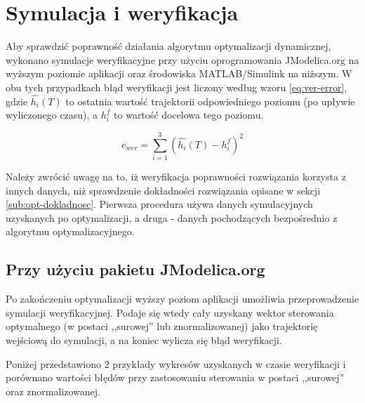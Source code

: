 \section{Symulacja i weryfikacja}
\label{sec:sym-wer}

Aby sprawdzić poprawność działania algorytmu optymalizacji dynamicznej, wykonano symulacje weryfikacyjne przy użyciu oprogramowania JModelica.org na wyższym poziomie aplikacji oraz środowiska MATLAB/Simulink na niższym.
W obu tych przypadkach błąd weryfikacji jest liczony według wzoru \ref{eq:ver-error}, gdzie $\hat{h_{i}}(T)$ to ostatnia wartość trajektorii odpowiedniego poziomu (po upływie wyliczonego czasu), a $h_{i}^{f}$ to wartość docelowa tego poziomu.

\begin{equation}\label{eq:ver-error}
e_{wer} = \sum_{i=1}^{3} (\hat{h_{i}}(T) - h_{i}^{f})^{2}
\end{equation}

Należy zwrócić uwagę na to, iż weryfikacja poprawności rozwiązania korzysta z innych danych, niż sprawdzenie dokładności rozwiązania opisane w sekcji \ref{sub:opt-dokladnosc}. Pierwsza procedura używa danych symulacyjnych uzyskanych po optymalizacji, a druga - danych pochodzących bezpośrednio z algorytmu optymalizacyjnego.

\subsection{Przy użyciu pakietu JModelica.org}
\label{sub:sym-wer-jmodelica}

Po zakończeniu optymalizacji wyższy poziom aplikacji umożliwia przeprowadzenie symulacji weryfikacyjnej. Podaje się wtedy cały uzyskany wektor sterowania optymalnego (w postaci ,,surowej'' lub znormalizowanej) jako trajektorię wejściową do symulacji, a na koniec wylicza się błąd weryfikacji.

Poniżej przedstawiono 2 przykłady wykresów uzyskanych w czasie weryfikacji i porównano wartości błędów przy zastosowaniu sterowania w postaci ,,surowej'' oraz znormalizowanej.

